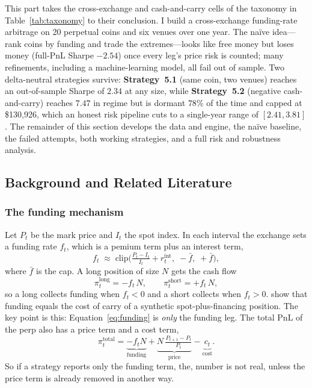 \documentclass[10pt,twocolumn,a4paper]{article}
\begin{document}
This part takes the cross-exchange and cash-and-carry cells of the
taxonomy in Table~\ref{tab:taxonomy} to their conclusion.  I build a
cross-exchange funding-rate arbitrage on 20 perpetual coins and six venues
over one year.  The na\"ive idea---rank coins by funding and trade the
extremes---looks like free money but loses money (full-PnL Sharpe $-2.54$)
once every leg's price risk is counted; many refinements, including a
machine-learning model, all fail out of sample.  Two delta-neutral
strategies survive: \textbf{Strategy~5.1} (same coin, two venues) reaches an
out-of-sample Sharpe of $2.34$ at any size, while \textbf{Strategy~5.2}
(negative cash-and-carry) reaches $7.47$ in regime but is dormant $78\%$
of the time and capped at \$130{,}926, which an honest risk pipeline cuts
to a single-year range of $[2.41, 3.81]$.  The remainder of this section
develops the data and engine, the na\"ive baseline, the failed attempts,
both working strategies, and a full risk and robustness analysis.

\subsection{Background and Related Literature}
\label{sec:background}

\subsubsection{The funding mechanism}
\label{sec:mechanism}

Let $P_t$ be the mark price and $I_t$ the spot index.  In each interval the exchange
sets a funding rate $f_t$, which is a pemium term plus an interest term,
\begin{equation}
  f_t \;\approx\; \text{clip}\!\Big(\tfrac{P_t - I_t}{I_t} + r^{\text{int}}_t,
       \; -\bar f,\; +\bar f\Big),
  \label{eq:funding_def}
\end{equation}
where $\bar f$ is the cap.  A long position of size $N$ gets the cash flow
\begin{equation}
  \pi^{\text{long}}_t = -f_t\,N, \qquad
  \pi^{\text{short}}_t = +f_t\,N ,
  \label{eq:funding}
\end{equation}
so a long collects funding when $f_t < 0$ and a short collects when $f_t > 0$.
\cite{ackerer2024perpetual} show that funding equals the cost of carry of a synthetic
spot-plus-financing position.  The key point is this: Equation~\eqref{eq:funding} is
\emph{only} the funding leg.  The total PnL of the perp also has a price term and a
cost term,
\begin{equation}
  \pi^{\text{total}}_t = \underbrace{-f_t N}_{\text{funding}}
                       + \underbrace{N\,\tfrac{P_{t+1}-P_t}{P_t}}_{\text{price}}
                       - \underbrace{c_t}_{\text{cost}} .
  \label{eq:total}
\end{equation}
So if a strategy reports only the funding term, the, number is not real, unless the
price term is already removed in another way.
\end{document}
